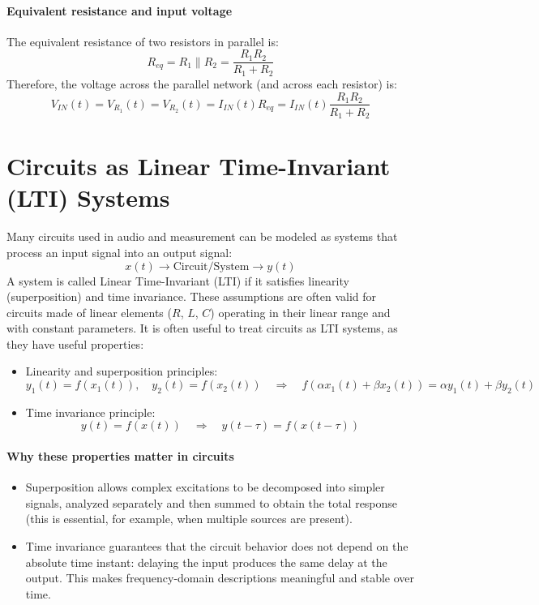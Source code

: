 \paragraph{Equivalent resistance and input voltage} The equivalent resistance of two resistors in parallel is:
\[
R_{eq} = R_1 \parallel R_2 = \frac{R_1 R_2}{R_1 + R_2}
\]
Therefore, the voltage across the parallel network (and across each resistor) is:
\[
V_{IN}(t) = V_{R_1}(t) = V_{R_2}(t) = I_{IN}(t)R_{eq}
= I_{IN}(t)\frac{R_1 R_2}{R_1 + R_2}
\]

\section{Circuits as Linear Time-Invariant (LTI) Systems}

Many circuits used in audio and measurement can be modeled as systems that process an input signal into an output signal:
\[
x(t) \longrightarrow \boxed{\text{Circuit/System}} \longrightarrow y(t)
\]
A system is called Linear Time-Invariant (LTI) if it satisfies linearity (superposition) and time invariance. These assumptions are often valid for circuits made of linear elements (\(R\), \(L\), \(C\)) operating in their linear range and with constant parameters. It is often useful to treat circuits as LTI systems, as they have useful properties:

\begin{itemize}
    \item Linearity and superposition principles:
    \[
    y_1(t) = f(x_1(t)), \quad y_2(t) = f(x_2(t))
    \quad \Rightarrow \quad
    f(\alpha x_1(t) + \beta x_2(t)) = \alpha y_1(t) + \beta y_2(t)
    \]
    \item Time invariance principle:
    \[
    y(t) = f(x(t))
    \quad \Rightarrow \quad
    y(t - \tau) = f(x(t - \tau))
    \]
\end{itemize}

\paragraph{Why these properties matter in circuits}

\begin{itemize}
    \item Superposition allows complex excitations to be decomposed into simpler signals, analyzed separately and then summed to obtain the total response (this is essential, for example, when multiple sources are present).
    \item Time invariance guarantees that the circuit behavior does not depend on the absolute time instant: delaying the input produces the same delay at the output. This makes frequency-domain descriptions meaningful and stable over time. 
\end{itemize}

